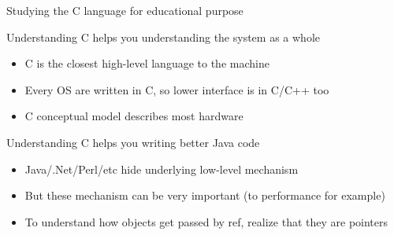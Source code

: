 \begin{frame}{Studying the C language for educational purpose}
  \begin{block}{Understanding C helps you understanding the system as a whole}
    \begin{itemize}
    \item C is the closest high-level language to the machine
    \item Every OS are written in C, so lower interface is in C/C++ too
    \item {} C conceptual model describes
      most hardware
    \end{itemize}
  \end{block}
  \begin{block}{Understanding C helps you writing better Java code}
    \begin{itemize}
    \item Java/.Net/Perl/etc hide underlying low-level mechanism
    \item But these mechanism can be very important (to performance for example)
    \item To understand how objects get passed by ref, realize that they are
      pointers
    \end{itemize}
  \end{block}
\end{frame}
